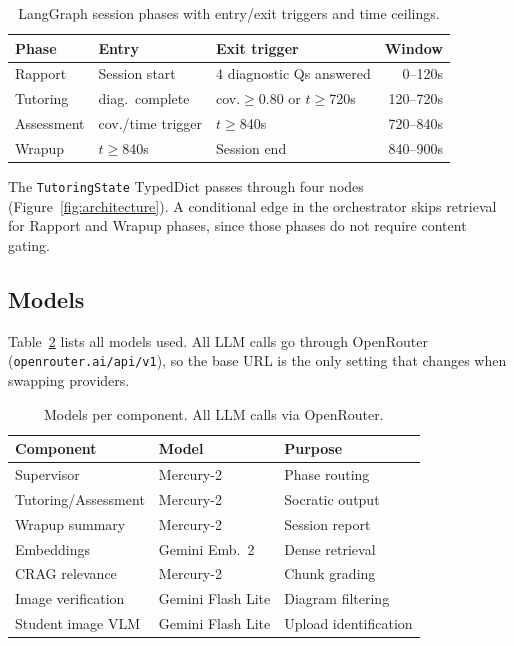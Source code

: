 \documentclass[11pt]{article}
\begin{document}
\begin{table}
\centering
\small
\begin{tabularx}{\columnwidth}{@{}l l X r@{}}
\toprule
\textbf{Phase} & \textbf{Entry} & \textbf{Exit trigger} & \textbf{Window} \\
\midrule
Rapport    & Session start     & 4 diagnostic Qs answered       & 0--120s   \\
Tutoring   & diag.\ complete   & cov.$\geq$0.80 or $t\geq$720s  & 120--720s \\
Assessment & cov./time trigger & $t\geq$840s                    & 720--840s \\
Wrapup     & $t\geq$840s       & Session end                    & 840--900s \\
\bottomrule
\end{tabularx}
\caption{LangGraph session phases with entry/exit triggers and time ceilings.}
\label{tab:phases}
\end{table}

The \texttt{TutoringState} TypedDict passes through four nodes
(Figure~\ref{fig:architecture}).
A conditional edge in the orchestrator skips retrieval for Rapport and Wrapup phases,
since those phases do not require content gating.

\subsection{Models}
\label{sec:models}

Table~\ref{tab:models} lists all models used. All LLM calls go through
OpenRouter (\texttt{openrouter.ai/api/v1}), so the base URL is the only
setting that changes when swapping providers.

\begin{table}
\centering
\setlength{\tabcolsep}{3pt}
\scriptsize
\begin{tabular}{lll}
\hline
\textbf{Component} & \textbf{Model} & \textbf{Purpose} \\
\hline
Supervisor            & Mercury-2          & Phase routing \\
Tutoring/Assessment   & Mercury-2          & Socratic output \\
Wrapup summary        & Mercury-2          & Session report \\
Embeddings            & Gemini Emb.\ 2     & Dense retrieval \\
CRAG relevance        & Mercury-2          & Chunk grading \\
Image verification    & Gemini Flash Lite  & Diagram filtering \\
Student image VLM     & Gemini Flash Lite  & Upload identification \\
\hline
\end{tabular}
\caption{Models per component. All LLM calls via OpenRouter.}
\label{tab:models}
\end{table}
\end{document}
